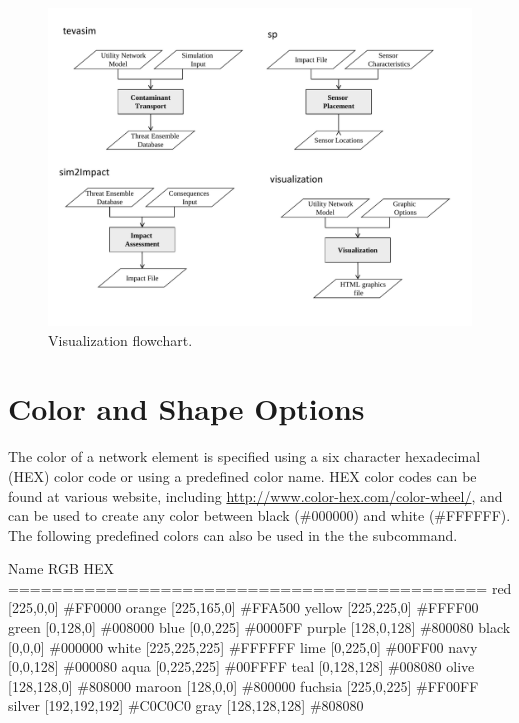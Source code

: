 \begin{figure}[h]
  \centering
  \includegraphics[scale=0.80]{graphics/visualization_flowchart.pdf}
  \caption{Visualization flowchart.}
  \label{fig:visualization-flowchart}
\end{figure}

\section{Color and Shape Options}
The color of a network element is specified using a six character hexadecimal (HEX) color code or using a 
predefined color name. HEX color codes can be found at various website, 
including \url{http://www.color-hex.com/color-wheel/}, and can be used to create 
any color between black (\#000000) and white (\#FFFFFF).
The following predefined colors can also be used in the the  
subcommand.
\begin{unknownListing}
  Name    RGB           HEX
============================================
  red     [225,0,0]     \#FF0000 
  orange  [225,165,0]   \#FFA500
  yellow  [225,225,0]   \#FFFF00  
  green   [0,128,0]     \#008000
  blue    [0,0,225]     \#0000FF
  purple  [128,0,128]   \#800080
  black   [0,0,0]       \#000000
  white   [225,225,225] \#FFFFFF
  lime    [0,225,0]     \#00FF00
  navy    [0,0,128]     \#000080
  aqua    [0,225,225]   \#00FFFF
  teal    [0,128,128]   \#008080
  olive   [128,128,0]   \#808000
  maroon  [128,0,0]     \#800000
  fuchsia [225,0,225]   \#FF00FF
  silver  [192,192,192] \#C0C0C0
  gray    [128,128,128] \#808080
\end{unknownListing}

